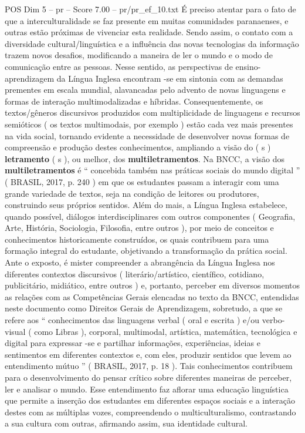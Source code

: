 \begin{textsample}{POS Dim 5 – pr – Score 7.00 – pr/pr\_ef\_10.txt}
É preciso atentar para o fato de que a interculturalidade se faz presente em muitas comunidades paranaenses, e outras estão próximas de vivenciar esta realidade.
Sendo assim, o contato com a diversidade cultural/linguística e a influência das novas tecnologias da informação trazem novos desafios, modificando a maneira de ler o mundo e o modo de comunicação entre as pessoas.
Nesse sentido, as perspectivas de ensino-aprendizagem da Língua Inglesa encontram -se em sintonia com as demandas prementes em escala mundial, alavancadas pelo advento de novas linguagens e formas de interação multimodalizadas e híbridas.
Consequentemente, os textos/gêneros discursivos produzidos com multiplicidade de linguagens e recursos semióticos ( os textos multimodais, por exemplo ) estão cada vez mais presentes na vida social, tornando evidente a necessidade de desenvolver novas formas de compreensão e produção destes conhecimentos, ampliando a visão do ( s ) \textbf{letramento} ( s ), ou melhor, dos \textbf{multiletramentos}.
Na BNCC, a visão dos \textbf{multiletramentos} é “ concebida também nas práticas sociais do mundo digital ” ( BRASIL, 2017, p. 240 ) em que os estudantes passam a interagir com uma grande variedade de textos, seja na condição de leitores ou produtores, construindo seus próprios sentidos.
Além do mais, a Língua Inglesa estabelece, quando possível, diálogos interdisciplinares com outros componentes ( Geografia, Arte, História, Sociologia, Filosofia, entre outros ), por meio de conceitos e conhecimentos historicamente construídos, os quais contribuem para uma formação integral do estudante, objetivando a transformação da prática social.
Ante o exposto, é mister compreender a abrangência da Língua Inglesa nos diferentes contextos discursivos ( literário/artístico, científico, cotidiano, publicitário, midiático, entre outros ) e, portanto, perceber em diversos momentos as relações com as Competências Gerais elencadas no texto da BNCC, entendidas neste documento como Direitos Gerais de Aprendizagem, sobretudo, a que se refere aos “ conhecimentos das linguagens verbal ( oral e escrita ) e/ou verbo-visual ( como Libras ), corporal, multimodal, artística, matemática, tecnológica e digital para expressar -se e partilhar informações, experiências, ideias e sentimentos em diferentes contextos e, com eles, produzir sentidos que levem ao entendimento mútuo ” ( BRASIL, 2017, p. 18 ).
Tais conhecimentos contribuem para o desenvolvimento do pensar crítico sobre diferentes maneiras de perceber, ler e analisar o mundo.
Esse entendimento faz aflorar uma educação linguística que permite a inserção dos estudantes em diferentes espaços sociais e a interação destes com as múltiplas vozes, compreendendo o multiculturalismo, contrastando a sua cultura com outras, afirmando assim, sua identidade cultural.

\end{textsample}
